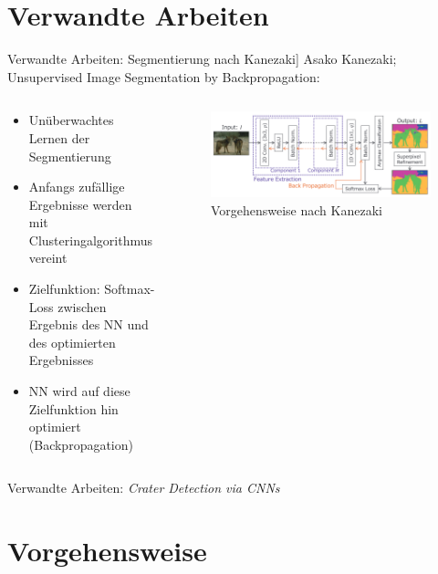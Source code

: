 \documentclass[9pt]{beamer}
\begin{document}
\section{Verwandte Arbeiten}

\begin{frame}{Verwandte Arbeiten: Segmentierung nach} Kanezaki\cite{kanezaki2018_unsupervised_segmentation}]
Asako Kanezaki; Unsupervised Image Segmentation by Backpropagation\cite{kanezaki2018_unsupervised_segmentation}:
\begin{columns}
	\begin{column}{.5\textwidth}
		\begin{itemize}
			\item Unüberwachtes Lernen der Segmentierung
			\item Anfangs zufällige Ergebnisse werden mit Clusteringalgorithmus vereint
			\item Zielfunktion: Softmax-Loss zwischen Ergebnis des NN und des optimierten Ergebnisses
			\item NN wird auf diese Zielfunktion hin optimiert (Backpropagation)
		\end{itemize}
	\end{column}
	\begin{column}{.5\textwidth}
		\begin{figure}
			\includegraphics[width=\textwidth,keepaspectratio]{kanezaki.png}
			\caption{Vorgehensweise nach Kanezaki\cite{kanezaki2018_unsupervised_segmentation}}
		\end{figure}
	\end{column}
\end{columns}
\end{frame}

\begin{frame}{Verwandte Arbeiten: \textit{Crater Detection via CNNs}\cite{2016arXiv160100978C}}
	
\end{frame}

\section{Vorgehensweise}
\end{document}
